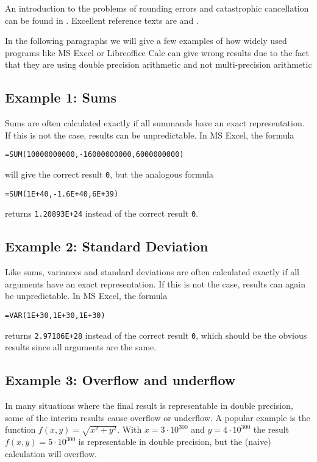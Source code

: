 An introduction to the problems of rounding errors and catastrophic cancellation can be found in \cite{Goldberg91whatevery}. Excellent reference texts are  \cite{Higham2002} and \cite{Higham2009}.

In the following paragraphs we will give a few examples of how widely used programs like MS Excel or Libreoffice Calc can give wrong results due to the fact that they are using double precision arithmetic and not multi-precision arithmetic

\subsection{Example 1: Sums}

Sums are often calculated exactly if all summands have an exact representation. If this is not the case, results can be unpredictable. In MS Excel, the formula

\begin{verbatim}
=SUM(10000000000,-16000000000,6000000000)
\end{verbatim}
 will give the correct result  \verb|0|, but the analogous formula
 \begin{verbatim}
=SUM(1E+40,-1.6E+40,6E+39)
 \end{verbatim}
returns \verb|1.20893E+24| instead of the correct result \verb|0|.

\subsection{Example 2: Standard Deviation}
Like sums, variances and standard deviations are often calculated exactly if all arguments have an exact representation. If this is not the case, results can again be unpredictable. In MS Excel, the formula
 \begin{verbatim}
=VAR(1E+30,1E+30,1E+30)
 \end{verbatim}
returns \verb|2.97106E+28| instead of the correct result \verb|0|, which should be the obvious results since all arguments are the same.


\subsection{Example 3: Overflow and underflow}

In many situations where the final result is representable in double precision, some of the interim results cause overflow or underflow. A popular example is the function $f(x,y) = \sqrt{x^2+y^2}$. With $x=3 \cdot 10^{300}$ and $y=4 \cdot 10^{300}$ the result $f(x,y) = 5 \cdot 10^{300}$ is representable in double precision, but the (naive) calculation will overflow.




